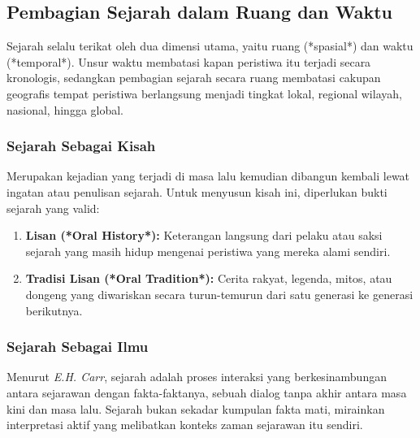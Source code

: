 \documentclass[12pt, a4paper]{article}
\begin{document}
\subsection{Pembagian Sejarah dalam Ruang dan Waktu}
Sejarah selalu terikat oleh dua dimensi utama, yaitu ruang (*spasial*) dan waktu (*temporal*). Unsur waktu membatasi kapan peristiwa itu terjadi secara kronologis, sedangkan pembagian sejarah secara ruang membatasi cakupan geografis tempat peristiwa berlangsung menjadi tingkat lokal, regional wilayah, nasional, hingga global.

\subsubsection{Sejarah Sebagai Kisah}
Merupakan kejadian yang terjadi di masa lalu kemudian dibangun kembali lewat ingatan atau penulisan sejarah. Untuk menyusun kisah ini, diperlukan bukti sejarah yang valid:
\begin{enumerate}
	\item \textbf{Lisan (*Oral History*):} Keterangan langsung dari pelaku atau saksi sejarah yang masih hidup mengenai peristiwa yang mereka alami sendiri.
	\item \textbf{Tradisi Lisan (*Oral Tradition*):} Cerita rakyat, legenda, mitos, atau dongeng yang diwariskan secara turun-temurun dari satu generasi ke generasi berikutnya.
\end{enumerate}

\subsubsection{Sejarah Sebagai Ilmu}
Menurut \textit{E.H. Carr}, sejarah adalah proses interaksi yang berkesinambungan antara sejarawan dengan fakta-faktanya, sebuah dialog tanpa akhir antara masa kini dan masa lalu. Sejarah bukan sekadar kumpulan fakta mati, mirainkan interpretasi aktif yang melibatkan konteks zaman sejarawan itu sendiri.
\end{document}
